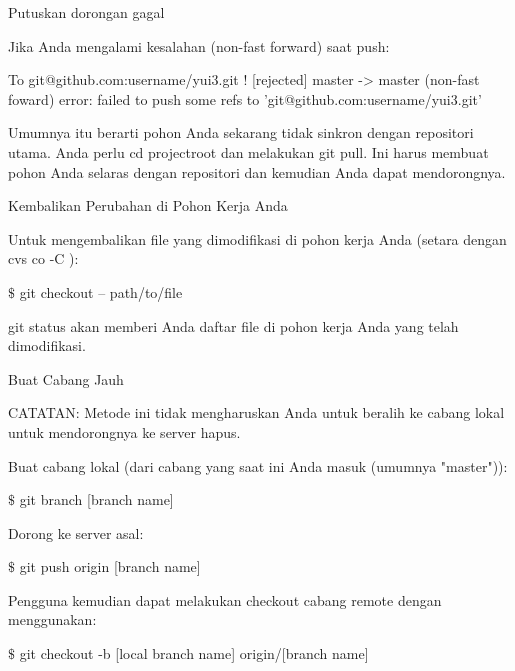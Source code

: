 \noindent 
 $  $Putuskan dorongan gagal \par
\vspace{12pt}
\noindent 
Jika Anda mengalami kesalahan (non-fast forward) saat push: \par
\noindent 
 To git@github.com:username/yui3.git ! [rejected] master -> master (non-fast foward) error: failed to push some refs to 'git@github.com:username/yui3.git'  \par
\vspace{12pt}
\noindent 
Umumnya itu berarti pohon Anda sekarang tidak sinkron dengan repositori utama. $  $Anda perlu cd projectroot dan melakukan git pull. $  $Ini harus membuat pohon Anda selaras dengan repositori dan kemudian Anda dapat mendorongnya. \par
\vspace{12pt}
\noindent 
 $  $Kembalikan Perubahan di Pohon Kerja Anda \par
\vspace{12pt}
\noindent 
Untuk mengembalikan file yang dimodifikasi di pohon kerja Anda (setara dengan $  $cvs co -C $  $): \par
\noindent 
  $  \$  $ git checkout -- path/to/file  \par
\noindent 
git status $  $akan memberi Anda daftar file di pohon kerja Anda yang telah dimodifikasi. \par
\vspace{12pt}
\noindent 
 $  $Buat Cabang Jauh \par
\vspace{12pt}
\noindent 
CATATAN: Metode ini tidak mengharuskan Anda untuk beralih ke cabang lokal untuk mendorongnya ke server hapus. \par
\vspace{12pt}
\noindent 
Buat cabang lokal (dari cabang yang saat ini Anda masuk (umumnya "master")): \par
\noindent 
  $  \$  $ git branch [branch name]  \par
\vspace{12pt}
\noindent 
Dorong ke server asal: \par
\vspace{12pt}
\noindent 
  $  \$  $ git push origin [branch name]  \par
\vspace{12pt}
\noindent 
Pengguna kemudian dapat melakukan checkout cabang remote dengan menggunakan: \par
\vspace{12pt}
\noindent 
  $  \$  $ git checkout -b [local branch name] origin/[branch name]  \par
